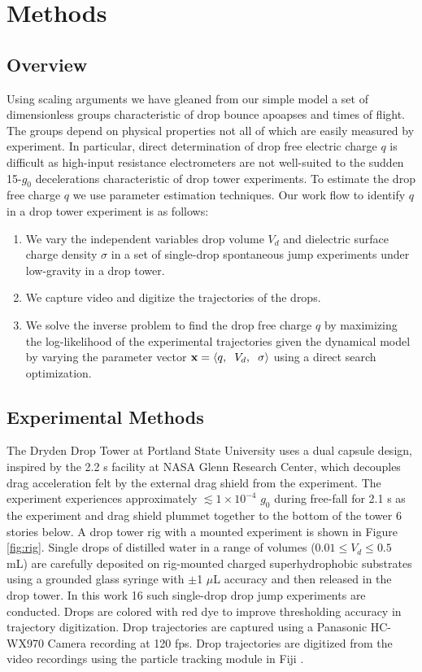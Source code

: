 \documentclass[aip,reprint, floatfix]{revtex4-1}
\begin{document}
\section{Methods}
\subsection{Overview}
Using scaling arguments we have gleaned from our simple model a set of dimensionless groups characteristic of drop bounce apoapses and times of flight. The groups depend on physical properties not all of which are easily measured by experiment. In particular, direct determination of drop free electric charge $q$ is difficult as high-input resistance electrometers are not well-suited to the sudden 15-$g_0$ decelerations characteristic of drop tower experiments. To estimate the drop free charge $q$ we use parameter estimation techniques. Our work flow to identify $q$ in a drop tower experiment is as follows:
\begin{enumerate}
\item We vary the independent variables drop volume $V_d$ and dielectric surface charge density $\sigma$ in a set of single-drop spontaneous  jump experiments under low-gravity in a drop tower. 
\item We capture video and digitize the trajectories of the drops. 
\item We solve the inverse problem to find the drop free charge $q$ by maximizing the log-likelihood of the experimental trajectories given the dynamical model by varying the parameter vector $\mathbf{x} = \left\langle q, \hspace{2 mm} V_d, \hspace{2 mm} \sigma \right\rangle$ using a direct search optimization.                     
\end{enumerate}

\subsection{Experimental Methods}
The Dryden Drop Tower at Portland State University uses a dual capsule design, inspired by the 2.2 s facility at NASA Glenn Research Center, which decouples drag acceleration felt by the external drag shield from the experiment. The experiment experiences approximately $\lesssim 1 \times 10^{-4}$ $g_0$ during free-fall for 2.1 s as the experiment and drag shield plummet together to the bottom of the tower 6 stories below. A drop tower rig with a mounted experiment is shown in Figure \ref{fig:rig}. Single drops of distilled water in a range of volumes ($0.01 \leq V_d \leq 0.5$ mL) are carefully deposited on rig-mounted charged superhydrophobic substrates using a grounded glass syringe with $\pm $1 $\mu$L accuracy and then released in the drop tower. In this work 16 such single-drop drop jump experiments are conducted. Drops are colored with red dye to improve thresholding accuracy in trajectory digitization. Drop trajectories are captured using a Panasonic HC-WX970 Camera recording at 120 fps. Drop trajectories are digitized from the video recordings using the particle tracking module in Fiji \cite{schindelin_fiji:_2012}.
\end{document}
